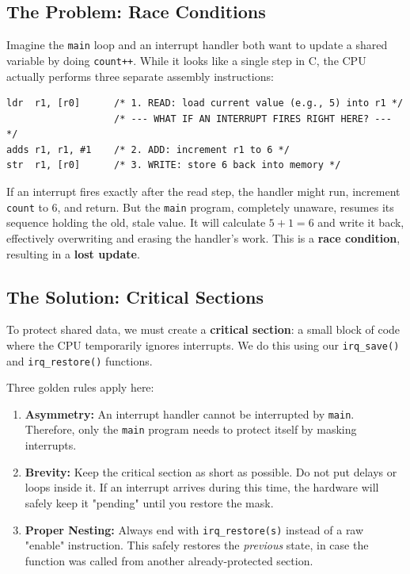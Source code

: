 \subsection{The Problem: Race Conditions}
Imagine the \texttt{main} loop and an interrupt handler both want to update a shared variable by doing \texttt{count++}. While it looks like a single step in C, the CPU actually performs three separate assembly instructions:

\begin{lstlisting}
ldr  r1, [r0]      /* 1. READ: load current value (e.g., 5) into r1 */
                   /* --- WHAT IF AN INTERRUPT FIRES RIGHT HERE? --- */
adds r1, r1, #1    /* 2. ADD: increment r1 to 6 */
str  r1, [r0]      /* 3. WRITE: store 6 back into memory */
\end{lstlisting}

If an interrupt fires exactly after the read step, the handler might run, increment \texttt{count} to 6, and return. But the \texttt{main} program, completely unaware, resumes its sequence holding the old, stale value. It will calculate $5 + 1 = 6$ and write it back, effectively overwriting and erasing the handler's work. This is a \textbf{race condition}, resulting in a \textbf{lost update}.

\subsection{The Solution: Critical Sections}
To protect shared data, we must create a \textbf{critical section}: a small block of code where the CPU temporarily ignores interrupts. We do this using our \texttt{irq\_save()} and \texttt{irq\_restore()} functions.

Three golden rules apply here:
\begin{enumerate}
    \item \textbf{Asymmetry:} An interrupt handler cannot be interrupted by \texttt{main}. Therefore, only the \texttt{main} program needs to protect itself by masking interrupts.
    \item \textbf{Brevity:} Keep the critical section as short as possible. Do not put delays or loops inside it. If an interrupt arrives during this time, the hardware will safely keep it "pending" until you restore the mask.
    \item \textbf{Proper Nesting:} Always end with \texttt{irq\_restore(s)} instead of a raw "enable" instruction. This safely restores the \textit{previous} state, in case the function was called from another already-protected section.
\end{enumerate}

